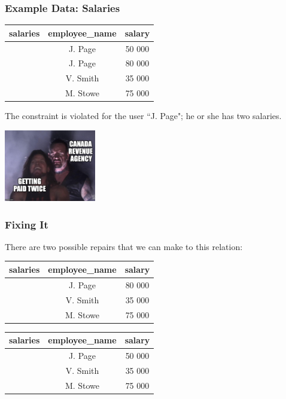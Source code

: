 \begin{frame}
\frametitle{Example Data: Salaries}


\begin{table}[h]\begin{center}
        \begin{tabular}{r | c  c} 
					salaries & employee\_name & salary \\ \hline
	           		 & J. Page  & 50 000 \\ 
	         		 & J. Page  & 80 000 \\ 
					 & V. Smith & 35 000 \\ 
					 & M. Stowe & 75 000 \\ 
        \end{tabular}
\end{center}\end{table}

The constraint is violated for the user ``J. Page"; he or she has two salaries.

\begin{center}
	\includegraphics[width=0.3\textwidth]{images/cra.jpg}
\end{center}

\end{frame}

\begin{frame}
\frametitle{Fixing It}

There are two possible repairs that we can make to this relation:

\begin{table}[h]\begin{center}
        \begin{tabular}{r | c  c} 
					salaries & employee\_name & salary \\ \hline
	         		 & J. Page  & 80 000 \\ 
					 & V. Smith & 35 000 \\ 
					 & M. Stowe & 75 000 \\ 
        \end{tabular}
\end{center}\end{table}

\begin{table}[h]\begin{center}
        \begin{tabular}{r | c  c} 
					salaries & employee\_name & salary \\ \hline
	           		 & J. Page  & 50 000 \\ 
					 & V. Smith & 35 000 \\ 
					 & M. Stowe & 75 000 \\ 
        \end{tabular}
\end{center}\end{table}

\end{frame}


